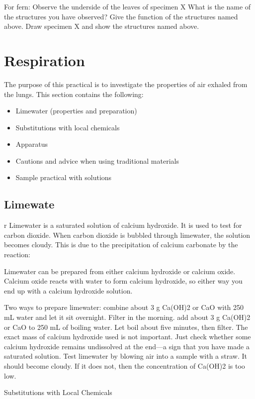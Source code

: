 \begin{enumerate}
For fern:
Observe the underside of the leaves of specimen X
What is the name of the structures you have observed?
Give the function of the structures named above.
Draw specimen X and show the structures named above.
\section{Respiration}

The purpose of this practical is to investigate the properties of air exhaled from the lungs. This section contains the following:

\begin{itemize}
\item{Limewater (properties and preparation)}
\item{Substitutions with local chemicals}
\item{Apparatus}
\item{Cautions and advice when using traditional materials}
\item{Sample practical with solutions}
\end{itemize}

\subsection{Limewate}r
Limewater is a saturated solution of calcium hydroxide. It is used to test for carbon dioxide. When carbon dioxide is bubbled through limewater, the solution becomes cloudy. This is due to the precipitation of calcium carbonate by the reaction:



Limewater can be prepared from either calcium hydroxide or calcium oxide. Calcium oxide reacts with water to form calcium hydroxide, so either way you end up with a calcium hydroxide solution.

Two ways to prepare limewater:
combine about 3 g Ca(OH)2 or CaO with 250 mL water and let it sit overnight. Filter in the morning.
add about 3 g Ca(OH)2 or CaO to 250 mL of boiling water. Let boil about five minutes, then filter. 
The exact mass of calcium hydroxide used is not important. Just check whether some calcium hydroxide remains undissolved at the end—a sign that you have made a saturated solution.
Test limewater by blowing air into a sample with a straw. It should become cloudy. If it does not, then the concentration of Ca(OH)2 is too low.

Substitutions with Local Chemicals


\end{enumerate}
